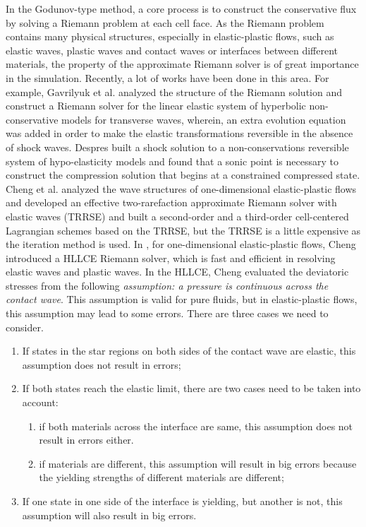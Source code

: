 \documentclass{article}
\numberwithin{equation}{section}
\numberwithin{table}{section}
\begin{document}
In the  Godunov-type method,  a core process is to construct the conservative flux by solving a Riemann problem  at each cell face. As the Riemann problem contains many physical structures, especially in elastic-plastic flows, such as elastic waves, plastic waves and contact waves or interfaces between different materials, the property of the approximate Riemann solver is of great importance in the simulation. Recently, a lot of works have been done in this area. For example, Gavrilyuk et al. \cite{gavrilyuk2008modelling} analyzed the structure of the Riemann solution and construct a Riemann solver for the linear elastic system  of hyperbolic non-conservative models for transverse waves, wherein, an extra evolution equation was added in order to make the elastic transformations reversible in the absence of shock waves. Despres \cite{despres2007geometrical} built a shock solution to a non-conservations reversible system of hypo-elasticity models and found that a sonic point is necessary to construct  the compression solution that begins at a constrained compressed state.  Cheng et al.  \cite{cheng2015high} analyzed the wave structures of one-dimensional elastic-plastic flows and developed an effective two-rarefaction approximate Riemann solver with elastic waves (TRRSE) and built a  second-order and  a third-order cell-centered Lagrangian schemes based on the TRRSE, but the TRRSE is a little  expensive as  the iteration method is used.
In \cite{cheng2016harten}, for one-dimensional elastic-plastic flows, Cheng introduced a HLLCE Riemann solver, which is fast and efficient in resolving elastic waves and plastic waves. In the HLLCE,  Cheng evaluated the deviatoric stresses from the following \emph{assumption: a pressure is continuous across the contact wave}. This assumption is valid for pure fluids, but  in  elastic-plastic flows, this assumption may lead to some errors. There are three cases we need  to consider.
\begin{enumerate}
  \item If states in the star regions on both sides of the contact wave are elastic, this assumption does not result in errors;
  \item If both states reach the elastic limit, there are two cases need  to be taken into account:
  \begin{enumerate}
    \item if both  materials across the interface are same, this assumption does not result in errors either.
    \item if  materials are different, this assumption will result in big errors because the yielding strengths of different materials are different;
  \end{enumerate}
  \item If one state in one side of the interface is yielding, but another is  not,  this assumption will  also result in big errors.
\end{enumerate}
\end{document}
